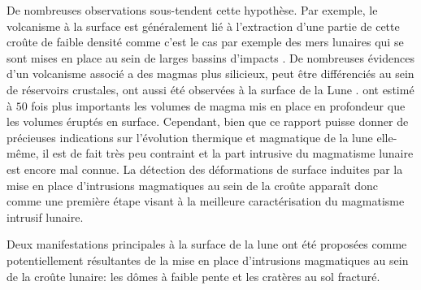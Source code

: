 De nombreuses observations sous-tendent  cette hypothèse. Par exemple,
le volcanisme à  la surface est généralement lié  à l'extraction d'une
partie  de cette  croûte  de faible  densité comme  c'est  le cas  par
exemple des mers lunaires qui se sont mises en place au sein de larges
bassins d'impacts  \citet{Wieczorek:2001jt}.  De  nombreuses évidences
d'un  volcanisme  associé  a  des magmas  plus  silicieux,  peut  être
différenciés au sein de réservoirs  crustales, ont aussi été observées
à          la           surface          de           la          Lune
\citep{Jolliff:2011he,Glotch:2010ih,Glotch:2011tk}.
\citet{Head:1992bk} ont estimé à $50$ fois plus importants les volumes
de  magma mis  en  place  en profondeur  que  les  volumes éruptés  en
surface.  Cependant, bien  que ce rapport puisse  donner de précieuses
indications  sur  l'évolution  thermique  et  magmatique  de  la  lune
elle-même, il est  de fait très peu contraint et  la part intrusive du
magmatisme  lunaire   est  encore   mal  connue.   La   détection  des
déformations de  surface induites  par la  mise en  place d'intrusions
magmatiques  au sein  de la  croûte apparaît  donc comme  une première
étape  visant à  la meilleure  caractérisation du  magmatisme intrusif
lunaire.

Deux  manifestations principales  à  la  surface de  la  lune ont  été
proposées  comme  potentiellement  résultantes  de la  mise  en  place
d'intrusions magmatiques  au sein  de la croûte  lunaire: les  dômes à
faible pente et les cratères au sol fracturé.

